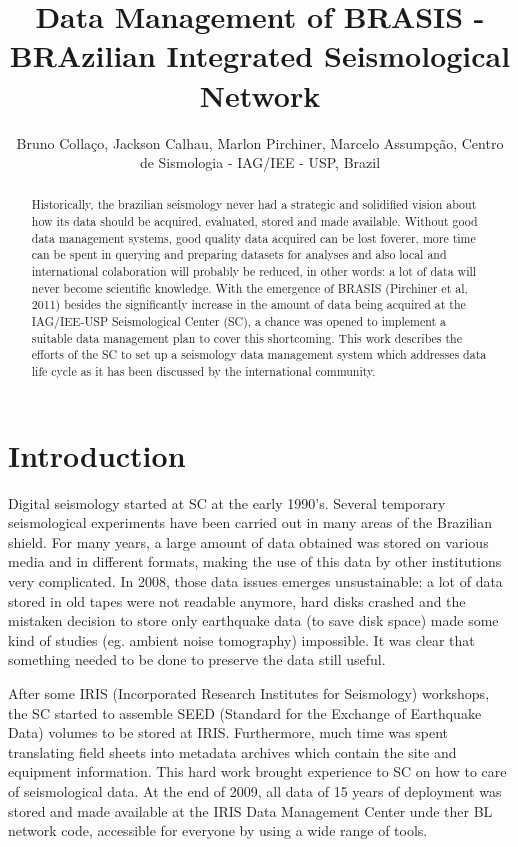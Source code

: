 \documentclass[twoside,letterpaper,twocolumn]{article}
\title{Data Management of BRASIS -
BRAzilian Integrated Seismological Network}
\author{Bruno Colla\c{c}o, Jackson Calhau, Marlon Pirchiner, Marcelo
Assump\c{c}\~{a}o, Centro de Sismologia - IAG/IEE - USP, Brazil }
\begin{document}
\maketitle

\begin{abstract}

Historically, the brazilian seismology never had a strategic and solidified vision about how its data should be acquired, evaluated, stored and made available. Without good data management systems, good quality data acquired can be lost foverer, more time can be spent in querying and preparing datasets for analyses and also local and international colaboration will probably be reduced, in other words: a lot of data will never become scientific knowledge. With the emergence of BRASIS (Pirchiner et al, 2011) besides the significantly increase in the amount of data being acquired at the IAG/IEE-USP Seismological Center (SC), a chance was opened to implement a suitable data management plan to cover this shortcoming. This work describes the efforts of the SC to set up a seismology data management system which addresses data life cycle as it has been discussed by the international community.

\end{abstract}

\section{Introduction}

Digital seismology started at SC at the early 1990's. Several temporary seismological experiments have been carried out in many areas of the Brazilian shield. For many years, a large amount of data obtained was stored on various media and in different formats, making the use of this data by other institutions very complicated. In 2008, those data issues emerges unsustainable: a lot of data stored in old tapes were not readable anymore, hard disks crashed and the mistaken decision to store only earthquake data (to save disk space) made some kind of studies (eg. ambient noise tomography) impossible. It was clear that something needed to be done to preserve the data still useful. 

After some IRIS (Incorporated Research Institutes for Seismology) workshops, the SC started to assemble SEED (Standard for the Exchange of Earthquake Data) volumes to be stored at IRIS. Furthermore, much time was spent translating field sheets into metadata archives which contain the site and equipment information. This hard work brought experience to SC on how to care of seismological data. At the end of 2009, all data of 15 years of deployment was stored and made available at the IRIS Data Management Center unde ther BL network code, accessible for everyone by using a wide range of tools.
\end{document}

